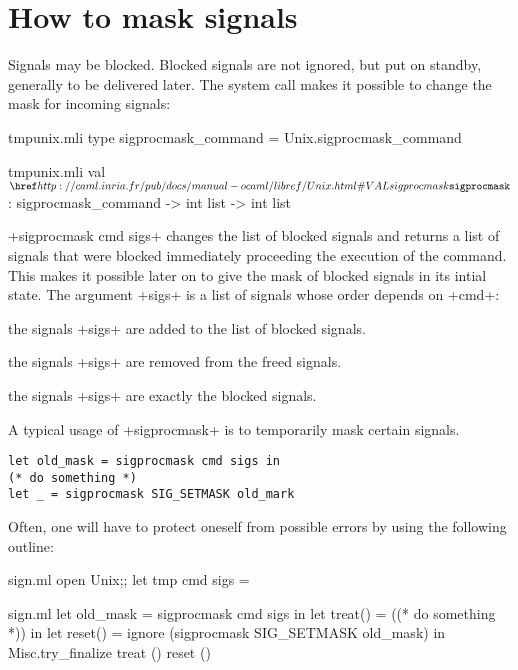 \section{How to mask signals}

Signals may be blocked.  Blocked signals are not ignored, but put on 
standby, generally to be delivered later.  The system call
 makes it possible to change the mask
for incoming signals:
%
\begin{codefile}{tmpunix.mli}
type sigprocmask_command = Unix.sigprocmask_command
\end{codefile}
%
\begin{listingcodefile}{tmpunix.mli}
val $\libvalue{Unix}{sigprocmask}$ : sigprocmask_command -> int list -> int list
\end{listingcodefile}
%
\ml+sigprocmask cmd sigs+ changes the list of blocked signals and 
returns a list of signals that were blocked immediately proceeding 
the execution of the command.  This makes it possible later on to 
give the mask of blocked signals in its intial state.  The argument 
\ml+sigs+ is a list of signals whose order depends on \ml+cmd+:

\begin{mltypecases}
 the signals \ml+sigs+ are added
to the list of blocked signals.

 the signals \ml+sigs+ are removed
from the freed signals.

 the signals \ml+sigs+ are exactly the 
blocked signals.
\end{mltypecases}
%
A typical usage of \ml+sigprocmask+ is to temporarily mask certain
signals.

%
\begin{lstlisting}
let old_mask = sigprocmask cmd sigs in 
(* do something *)
let _ = sigprocmask SIG_SETMASK old_mark
\end{lstlisting}
%
Often, one will have to protect oneself from possible errors by using
the following outline:

%
\begin{codefile}{sign.ml}
open Unix;;
let tmp cmd sigs = 
\end{codefile}
%
\begin{listingcodefile}{sign.ml}
let old_mask = sigprocmask cmd sigs in 
let treat() = ((* do something *)) in
let reset() = ignore (sigprocmask SIG_SETMASK old_mask) in
Misc.try_finalize treat () reset ()
\end{listingcodefile}

